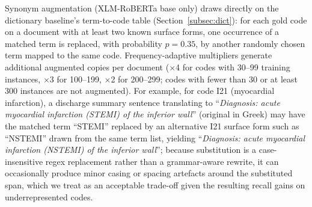 Synonym augmentation (XLM-RoBERTa base only) draws directly on the dictionary
baseline's term-to-code table (Section~\ref{subsec:dict}): for each gold code on a
document with at least two known surface forms, one occurrence of a matched term is
replaced, with probability $p=0.35$, by another randomly chosen term mapped to the
same code. Frequency-adaptive multipliers generate additional augmented copies per
document ($\times$4 for codes with 30--99 training instances, $\times$3 for
100--199, $\times$2 for 200--299; codes with fewer than 30 or at least 300 instances
are not augmented). For example, for code I21 (myocardial infarction), a discharge
summary sentence translating to ``\emph{Diagnosis: acute myocardial infarction
(STEMI) of the inferior wall}'' (original in Greek) may have the matched term
``STEMI'' replaced by an alternative I21 surface form such as ``NSTEMI'' drawn from
the same term list, yielding ``\emph{Diagnosis: acute myocardial infarction
(NSTEMI) of the inferior wall}''; because substitution is a case-insensitive regex
replacement rather than a grammar-aware rewrite, it can occasionally produce minor
casing or spacing artefacts around the substituted span, which we treat as an
acceptable trade-off given the resulting recall gains on underrepresented codes.
